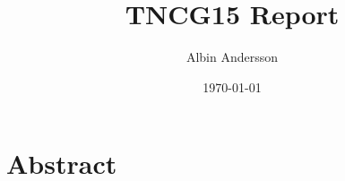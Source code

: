 \documentclass{article}
\title{TNCG15 Report}
\date{\today}
\author{Albin Andersson}
\begin{document}
    \maketitle

    \section{Abstract}
\end{document}

